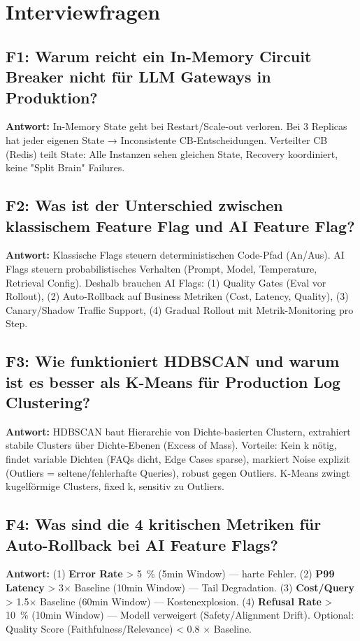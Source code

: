\section{Interviewfragen}

\subsection*{F1: Warum reicht ein In-Memory Circuit Breaker nicht für LLM Gateways in Produktion?}
\textbf{Antwort:} In-Memory State geht bei Restart/Scale-out verloren. Bei 3 Replicas hat jeder eigenen State → Inconsistente CB-Entscheidungen. Verteilter CB (Redis) teilt State: Alle Instanzen sehen gleichen State, Recovery koordiniert, keine "Split Brain" Failures.

\subsection*{F2: Was ist der Unterschied zwischen klassischem Feature Flag und AI Feature Flag?}
\textbf{Antwort:} Klassische Flags steuern deterministischen Code-Pfad (An/Aus). AI Flags steuern probabilistisches Verhalten (Prompt, Model, Temperature, Retrieval Config). Deshalb brauchen AI Flags: (1) Quality Gates (Eval vor Rollout), (2) Auto-Rollback auf Business Metriken (Cost, Latency, Quality), (3) Canary/Shadow Traffic Support, (4) Gradual Rollout mit Metrik-Monitoring pro Step.

\subsection*{F3: Wie funktioniert HDBSCAN und warum ist es besser als K-Means für Production Log Clustering?}
\textbf{Antwort:} HDBSCAN baut Hierarchie von Dichte-basierten Clustern, extrahiert stabile Clusters über Dichte-Ebenen (Excess of Mass). Vorteile: Kein k nötig, findet variable Dichten (FAQs dicht, Edge Cases sparse), markiert Noise explizit (Outliers = seltene/fehlerhafte Queries), robust gegen Outliers. K-Means zwingt kugelförmige Clusters, fixed k, sensitiv zu Outliers.

\subsection*{F4: Was sind die 4 kritischen Metriken für Auto-Rollback bei AI Feature Flags?}
\textbf{Antwort:} (1) \textbf{Error Rate} > 5~\% (5min Window) — harte Fehler. (2) \textbf{P99 Latency} > 3× Baseline (10min Window) — Tail Degradation. (3) \textbf{Cost/Query} > 1.5× Baseline (60min Window) — Kostenexplosion. (4) \textbf{Refusal Rate} > 10~\% (10min Window) — Modell verweigert (Safety/Alignment Drift). Optional: Quality Score (Faithfulness/Relevance) < 0.8 × Baseline.

